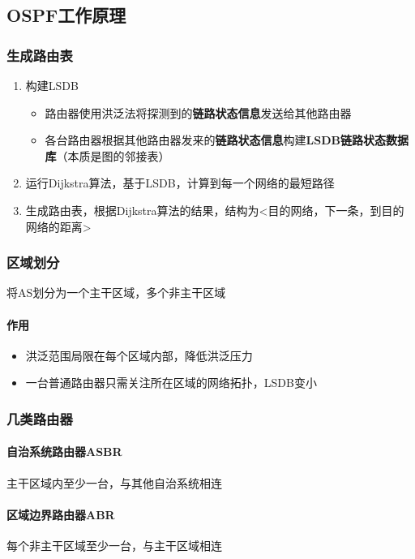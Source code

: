 \subsection{OSPF工作原理}

\subsubsection{生成路由表}
\begin{enumerate}
    \item 构建LSDB\begin{itemize}
        \item 路由器使用洪泛法将探测到的\textbf{链路状态信息}发送给其他路由器
        \item 各台路由器根据其他路由器发来的\textbf{链路状态信息}构建\textbf{LSDB链路状态数据库}（本质是图的邻接表）
    \end{itemize}
    \item 运行Dijkstra算法，基于LSDB，计算到每一个网络的最短路径
    \item 生成路由表，根据Dijkstra算法的结果，结构为<目的网络，下一条，到目的网络的距离>
\end{enumerate}


\subsubsection{区域划分}
将AS划分为一个主干区域，多个非主干区域

\paragraph{作用}
\begin{itemize}
    \item 洪泛范围局限在每个区域内部，降低洪泛压力
    \item 一台普通路由器只需关注所在区域的网络拓扑，LSDB变小
\end{itemize}


\subsubsection{几类路由器}

\paragraph{自治系统路由器ASBR}
主干区域内至少一台，与其他自治系统相连

\paragraph{区域边界路由器ABR}
每个非主干区域至少一台，与主干区域相连

